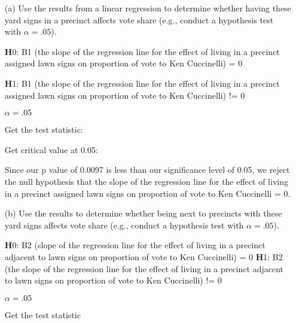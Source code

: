 \documentclass[12pt,letterpaper]{article}
\begin{document}
\vspace{.5cm}
\begin{enumerate}
	\item [(a)] Use the results from a linear regression to determine whether having these yard signs in a precinct affects vote share (e.g., conduct a hypothesis test with $\alpha = .05$).
	
	\textbf H0: B1 (the slope of the regression line for the effect of living in a precinct 
	assigned lawn signs on proportion of vote to Ken Cuccinelli) = 0
	
	\textbf H1: B1 (the slope of the regression line for the effect of living in a precinct 
	assigned lawn signs on proportion of vote to Ken Cuccinelli) != 0
	
	$\alpha = .05$

	\newpage
	\noindent Get the test statistic:
	
	
	\vspace{.1cm}
	
	\noindent Get critical value at 0.05:
	
	
	\vspace{.1cm}
	
	\noindent Since our p value of 0.0097 is less than our significance level of 0.05, we reject the null 
	hypothesis that the slope of the regression line for the effect of living in a precinct 
	assigned lawn signs on proportion of vote to Ken Cuccinelli  = 0. 
	
	\item [(b)]  Use the results to determine whether being
	next to precincts with these yard signs affects vote
	share (e.g., conduct a hypothesis test with $\alpha = .05$).
	
	\textbf H0: B2 (slope of the regression line for the effect of living in a precinct 
	adjacent to lawn signs on proportion of vote to Ken Cuccinelli) = 0
\newline
	\textbf H1: B2 (the slope of the regression line for the effect of living in a precinct 
	adjacent to lawn signs on proportion of vote to Ken Cuccinelli) != 0
	
		$\alpha = .05$
	
	Get the test statistic 
	
	
\vspace{.1cm}
	

\end{enumerate}
\end{document}
